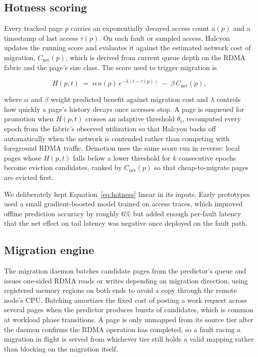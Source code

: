 \subsection{Hotness scoring}
Every tracked page $p$ carries an exponentially decayed access count $a(p)$ and a timestamp of last access $\tau(p)$. On each fault or sampled access, Halcyon updates the running score and evaluates it against the estimated network cost of migration, $C_{\mathrm{net}}(p)$, which is derived from current queue depth on the RDMA fabric and the page's size class. The score used to trigger migration is

\begin{equation}
\label{eq:hotness}
H(p,t) \;=\; \alpha \, a(p) \, e^{-\lambda \left(t - \tau(p)\right)} \;-\; \beta \, C_{\mathrm{net}}(p),
\end{equation}

\noindent where $\alpha$ and $\beta$ weight predicted benefit against migration cost and $\lambda$ controls how quickly a page's history decays once accesses stop. A page is enqueued for promotion when $H(p,t)$ crosses an adaptive threshold $\theta_t$, recomputed every epoch from the fabric's observed utilization so that Halcyon backs off automatically when the network is contended rather than competing with foreground RDMA traffic. Demotion uses the same score run in reverse: local pages whose $H(p,t)$ falls below a lower threshold for $k$ consecutive epochs become eviction candidates, ranked by $C_{\mathrm{net}}(p)$ so that cheap-to-migrate pages are evicted first.

We deliberately kept Equation~\ref{eq:hotness} linear in its inputs. Early prototypes used a small gradient-boosted model trained on access traces, which improved offline prediction accuracy by roughly 6\% but added enough per-fault latency that the net effect on tail latency was negative once deployed on the fault path.

\subsection{Migration engine}
The migration daemon batches candidate pages from the predictor's queue and issues one-sided RDMA reads or writes depending on migration direction, using registered memory regions on both ends to avoid a copy through the remote node's CPU. Batching amortizes the fixed cost of posting a work request across several pages when the predictor produces bursts of candidates, which is common at workload phase transitions. A page is only unmapped from its source tier after the daemon confirms the RDMA operation has completed, so a fault racing a migration in flight is served from whichever tier still holds a valid mapping rather than blocking on the migration itself.
